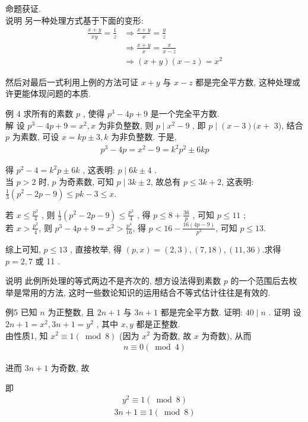 	命题获证.\\
	说明 另一种处理方式基于下面的变形: \begin{align}
		\frac{x+y}{x y}=\frac{1}{z} & \Rightarrow \frac{x+y}{x}=\frac{y}{z}   \\
		                            & \Rightarrow \frac{x+y}{x}=\frac{x}{x-z} \\
		                            & \Rightarrow(x+y)(x-z)=x^{2}
	\end{align}

	然后对最后一式利用上例的方法可证 $x+y$ 与 $x-z$ 都是完全平方数, 这种处理或许更能体现问题的本质.

	例 4 求所有的素数 $p$ , 使得 $p^{3}-4 p+9$ 是一个完全平方数. \\
	解 设 $p^{3}-4 p+9=x^{2}, x$ 为非负整数, 则 $p \mid x^{2}-9$ , 即 $p \mid(x-3)(x+$ 3), 结合 $p$ 为素数, 可设 $x=k p \pm 3, k$ 为非负整数. 于是,
\begin{align*}
	p^{3}-4 p=x^{2}-9=k^{2} p^{2} \pm 6 k p
\end{align*}

得 $p^{2}-4=k^{2} p \pm 6 k$ , 这表明:  $p \mid 6 k \pm 4$ . \\
当 $p>2$ 时, $p$ 为奇素数, 可知 $p \mid 3 k \pm 2$, 故总有 $p \leqslant 3 k+2$, 这表明: $\frac{1}{3}\left(p^{2}-2 p-9\right) \leqslant p k-3 \leqslant x$.

若 $x \leqslant \frac{p^{2}}{4}$ , 则 $\frac{1}{3}\left(p^{2}-2 p-9\right) \leqslant \frac{p^{2}}{4}$ , 得 $p \leqslant 8+\frac{36}{p}$ , 可知 $p \leqslant 11$ ; \\
若 $x>\frac{p^{2}}{4}$, 则 $p^{3}-4 p+9=x^{2}>\frac{p^{4}}{16}$, 得 $p<16-\frac{16(4 p-9)}{p^{3}}$, 可知 $p \leqslant 13$.

综上可知, $p \leqslant 13$ , 直接枚举, 得 $(p, x)=(2,3),(7,18),(11,36)$.求得 $p=2,7$ 或 11 .

说明 此例所处理的等式两边不是齐次的, 想方设法得到素数 $p$ 的一个范围后去枚举是常用的方法, 这时一些数论知识的运用结合不等式估计往往是有效的.

例5 已知 $n$ 为正整数, 且 $2 n+1$ 与 $3 n+1$ 都是完全平方数. 证明:  $40 \mid n$ . 证明 设 $2 n+1=x^{2}, 3 n+1=y^{2}$ , 其中 $x ,  y$ 都是正整数. \\
由性质1, 知 $x^{2} \equiv 1(\bmod 8)$ (因为 $x^{2}$ 为奇数, 故 $x$ 为奇数), 从而
\begin{align*}
	n \equiv 0(\bmod 4)
\end{align*}

进而 $3 n+1$ 为奇数, 故

即
\begin{align*}
	y^{2} \equiv 1(\bmod 8)
\end{align*}
\begin{align*}
	3 n+1 \equiv 1(\bmod 8)
\end{align*}

